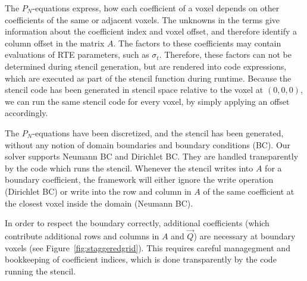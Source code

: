 The $P_N$-equations express, how each coefficient of a voxel depends on other coefficients of the same or adjacent voxels. The unknowns in the terms give information about the coefficient index and voxel offset, and therefore identify a column offset in the matrix $A$. The factors to these coefficients may contain evaluations of RTE parameters, such as $\sigma_t$. Therefore, these factors can not be determined during stencil generation, but are rendered into code expressions, which are executed as part of the stencil function during runtime. Because the stencil code has been generated in stencil space relative to the voxel at $(0,0,0)$, we can run the same stencil code for every voxel, by simply applying an offset accordingly. 

The $P_N$-equations have been discretized, and the stencil has been generated, without any notion of domain boundaries and boundary conditions (BC). Our solver supports Neumann BC and Dirichlet BC. They are handled transparently by the code which runs the stencil. Whenever the stencil writes into $A$ for a boundary coefficient, the framework will either ignore the write operation (Dirichlet BC) or write into the row and column in $A$ of the same coefficient at the closest voxel inside the domain (Neumann BC).

In order to respect the boundary correctly, additional coefficients (which contribute additional rows and columns in $A$ and $\vec{Q}$) are necessary at boundary voxels (see Figure~\ref{fig:staggeredgrid}). This requires careful managegment and bookkeeping of coefficient indices, which is done transparently by the code running the stencil.


